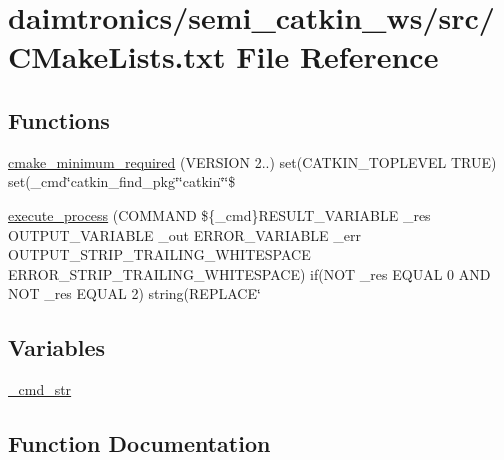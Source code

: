 \hypertarget{_c_make_lists_8txt}{}\section{daimtronics/semi\+\_\+catkin\+\_\+ws/src/\+C\+Make\+Lists.txt File Reference}
\label{_c_make_lists_8txt}
\subsection*{Functions}
\begin{DoxyCompactItemize}
\item 
\hyperlink{_c_make_lists_8txt_ab5607a27f36503780247017dd038c906}{cmake\+\_\+minimum\+\_\+required} (V\+E\+R\+S\+I\+ON 2..) set(C\+A\+T\+K\+I\+N\+\_\+\+T\+O\+P\+L\+E\+V\+EL T\+R\+UE) set(\+\_\+cmd\char`\"{}catkin\+\_\+find\+\_\+pkg\char`\"{}\char`\"{}catkin\char`\"{}\char`\"{}\$
\item 
\hyperlink{_c_make_lists_8txt_a3872d6c7d25506c3b3a62f1e0b82ca83}{execute\+\_\+process} (C\+O\+M\+M\+A\+ND \$\{\+\_\+cmd\}R\+E\+S\+U\+L\+T\+\_\+\+V\+A\+R\+I\+A\+B\+LE \+\_\+res O\+U\+T\+P\+U\+T\+\_\+\+V\+A\+R\+I\+A\+B\+LE \+\_\+out E\+R\+R\+O\+R\+\_\+\+V\+A\+R\+I\+A\+B\+LE \+\_\+err O\+U\+T\+P\+U\+T\+\_\+\+S\+T\+R\+I\+P\+\_\+\+T\+R\+A\+I\+L\+I\+N\+G\+\_\+\+W\+H\+I\+T\+E\+S\+P\+A\+CE E\+R\+R\+O\+R\+\_\+\+S\+T\+R\+I\+P\+\_\+\+T\+R\+A\+I\+L\+I\+N\+G\+\_\+\+W\+H\+I\+T\+E\+S\+P\+A\+CE) if(N\+OT \+\_\+res E\+Q\+U\+AL 0 A\+ND N\+OT \+\_\+res E\+Q\+U\+AL 2) string(R\+E\+P\+L\+A\+CE\char`\"{}
\end{DoxyCompactItemize}
\subsection*{Variables}
\begin{DoxyCompactItemize}
\item 
\hyperlink{_c_make_lists_8txt_a70b0be35802e7a1df142361751d711ef}{\+\_\+cmd\+\_\+str}
\end{DoxyCompactItemize}


\subsection{Function Documentation}
